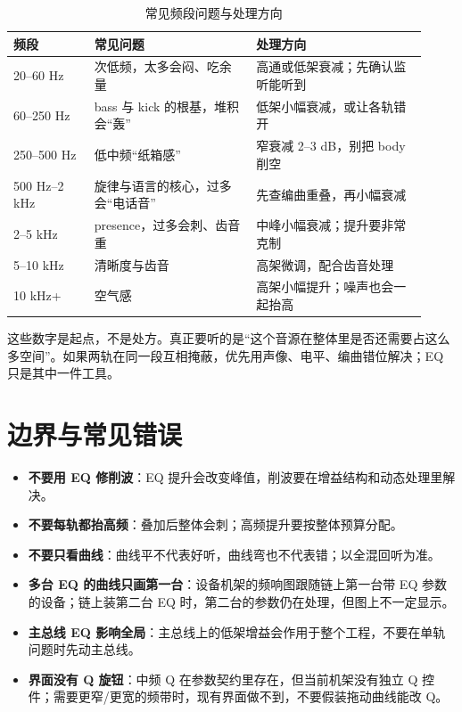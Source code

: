\begin{table}[htbp]
\centering
\small
\begin{tabular}{@{}p{0.18\linewidth}p{0.36\linewidth}p{0.38\linewidth}@{}}
\hline
频段 & 常见问题 & 处理方向 \\
\hline
20–60 Hz & 次低频，太多会闷、吃余量 & 高通或低架衰减；先确认监听能听到 \\
60–250 Hz &  bass 与 kick 的根基，堆积会“轰” & 低架小幅衰减，或让各轨错开 \\
250–500 Hz & 低中频“纸箱感” & 窄衰减 2–3 dB，别把 body 削空 \\
500 Hz–2 kHz & 旋律与语言的核心，过多会“电话音” & 先查编曲重叠，再小幅衰减 \\
2–5 kHz &  presence，过多会刺、齿音重 & 中峰小幅衰减；提升要非常克制 \\
5–10 kHz & 清晰度与齿音 & 高架微调，配合齿音处理 \\
10 kHz+ & 空气感 & 高架小幅提升；噪声也会一起抬高 \\
\hline
\end{tabular}
\caption{常见频段问题与处理方向}
\label{tab:eq-bands}
\end{table}

这些数字是起点，不是处方。真正要听的是“这个音源在整体里是否还需要占这么多空间”。如果两轨在同一段互相掩蔽，优先用声像、电平、编曲错位解决；EQ 只是其中一件工具。

\section{边界与常见错误}

\begin{itemize}
  \item \textbf{不要用 EQ 修削波}：EQ 提升会改变峰值，削波要在增益结构和动态处理里解决。
  \item \textbf{不要每轨都抬高频}：叠加后整体会刺；高频提升要按整体预算分配。
  \item \textbf{不要只看曲线}：曲线平不代表好听，曲线弯也不代表错；以全混回听为准。
  \item \textbf{多台 EQ 的曲线只画第一台}：设备机架的频响图跟随链上第一台带 EQ 参数的设备；链上装第二台 EQ 时，第二台的参数仍在处理，但图上不一定显示。
  \item \textbf{主总线 EQ 影响全局}：主总线上的低架增益会作用于整个工程，不要在单轨问题时先动主总线。
  \item \textbf{界面没有 Q 旋钮}：中频 Q 在参数契约里存在，但当前机架没有独立 Q 控件；需要更窄/更宽的频带时，现有界面做不到，不要假装拖动曲线能改 Q。
\end{itemize}

